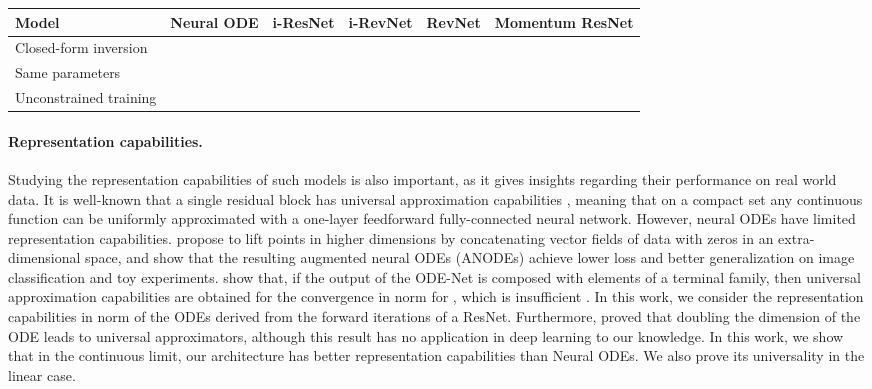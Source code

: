 \documentclass{article}
\newcommand{\cmark}{\ding{51}}\newcommand{\xmark}{\ding{55}}\setlength{\intextsep}{10pt plus 2pt minus 2pt}
\begin{document}
\vspace{-0.5em}
\begin{table*}[h!]
    \centering
    \begin{tabular}{ |p{4cm}|p{2cm}|p{2cm}|p{2cm}|p{2cm}|p{2cm}|}
     \hline
\textbf{Model} & Neural ODE &  i-ResNet & i-RevNet & RevNet & Momentum ResNet\\
 \hline
   Closed-form inversion & \cmark &  \xmark & \cmark & \cmark & \cmark \\
   \hline
 Same parameters  & \xmark &  \cmark & \xmark & \xmark & \cmark \\
 \hline
 Unconstrained training & \cmark &  \xmark & \cmark & \cmark & \cmark \\ 
 \hline
\end{tabular}
\caption{\label{tab:comparison_invertible_architectures} {\bf Comparison of reversible residual architectures} }
\end{table*}
 \fi 

\vspace{-0.5em}
 \paragraph{Representation capabilities.}

Studying the representation capabilities of such models is also important, as it gives insights regarding their performance on real world data. It is well-known that a single residual block has universal approximation capabilities \citep{Cybenkot2006ApproximationBS}, meaning that on a compact set any continuous function can be uniformly approximated with a one-layer feedforward fully-connected neural network. However, neural ODEs have limited representation capabilities. 
\citet{dupont2019augmented} propose to lift points in higher dimensions by concatenating vector fields of data with zeros in an extra-dimensional space, and show that the resulting augmented neural ODEs (ANODEs) achieve lower loss and better generalization on image classification and toy experiments.  \citet{li2019deep} show that, if the output of the ODE-Net is composed with elements of a terminal family, then universal approximation capabilities are obtained for the convergence in  norm for , which is insufficient \citep{teshima2020universal}. In this work, we consider the representation capabilities in  norm of the ODEs derived from the forward iterations of a ResNet.  Furthermore, \citet{zhang2019approximation} proved that doubling the dimension of the ODE leads to universal approximators, although this result has no application in deep learning to our knowledge.  In this work, we show that in the continuous limit, our architecture has better representation capabilities than Neural ODEs. We also prove its universality in the linear case.
\vspace{-0.5em}
\end{document}
